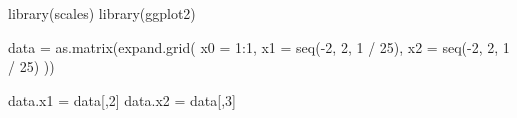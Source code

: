 \documentclass[
  a4paper,
]{article}
\newenvironment{Shaded}{\begin{snugshade}}{\end{snugshade}}
\newcommand{\AttributeTok}[1]{\textcolor[rgb]{0.77,0.63,0.00}{#1}}
\newcommand{\DecValTok}[1]{\textcolor[rgb]{0.00,0.00,0.81}{#1}}
\newcommand{\FunctionTok}[1]{\textcolor[rgb]{0.00,0.00,0.00}{#1}}
\newcommand{\NormalTok}[1]{#1}
\newcommand{\OtherTok}[1]{\textcolor[rgb]{0.56,0.35,0.01}{#1}}
\newcommand{\SpecialCharTok}[1]{\textcolor[rgb]{0.00,0.00,0.00}{#1}}
\begin{document}
\begin{Shaded}
\begin{Highlighting}[]
\FunctionTok{library}\NormalTok{(scales)}
\FunctionTok{library}\NormalTok{(ggplot2)}

\NormalTok{data }\OtherTok{=} \FunctionTok{as.matrix}\NormalTok{(}\FunctionTok{expand.grid}\NormalTok{(}
  \AttributeTok{x0 =} \DecValTok{1}\SpecialCharTok{:}\DecValTok{1}\NormalTok{,}
  \AttributeTok{x1 =} \FunctionTok{seq}\NormalTok{(}\SpecialCharTok{{-}}\DecValTok{2}\NormalTok{, }\DecValTok{2}\NormalTok{, }\DecValTok{1} \SpecialCharTok{/} \DecValTok{25}\NormalTok{),}
  \AttributeTok{x2 =} \FunctionTok{seq}\NormalTok{(}\SpecialCharTok{{-}}\DecValTok{2}\NormalTok{, }\DecValTok{2}\NormalTok{, }\DecValTok{1} \SpecialCharTok{/} \DecValTok{25}\NormalTok{)}
\NormalTok{))}

\NormalTok{data.x1 }\OtherTok{=}\NormalTok{ data[,}\DecValTok{2}\NormalTok{]}
\NormalTok{data.x2 }\OtherTok{=}\NormalTok{ data[,}\DecValTok{3}\NormalTok{]}


\end{Highlighting}
\end{Shaded}
\end{document}
